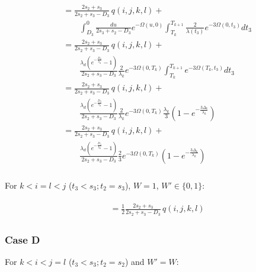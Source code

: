 \documentclass{article}
\begin{document}
\begin{align}
    \begin{split}
        &= \frac{2s_2+s_3}{2s_2+s_3-D_3}\,q(i,j,k,l) +\\
        &\qquad\int_{D_3}^{0}\frac{du}{2s_3+s_2-D_3}e^{-\Omega(u,0)}\int_{T_k}^{T_{k+1}}\frac{2}{\lambda(t_3)}e^{-3\Omega(0,t_3)}dt_3\\
        &= \frac{2s_2+s_3}{2s_2+s_3-D_3}\,q(i,j,k,l) +\\
        &\qquad\frac{\lambda_d\left(e^{-\frac{D_3}{\lambda_d}}-1\right)}{2s_2+s_3-D_3}
        \frac{2}{\lambda_k}e^{-3\Omega(0,T_k)}\int_{T_k}^{T_{k+1}}e^{-3\Omega(T_k,t_3)}dt_3\\
        &= \frac{2s_2+s_3}{2s_2+s_3-D_3}\,q(i,j,k,l) +\\
        &\qquad\frac{\lambda_d\left(e^{-\frac{D_3}{\lambda_d}}-1\right)}{2s_2+s_3-D_3}
        \frac{2}{\lambda_k}e^{-3\Omega(0,T_k)}\frac{\lambda_k}{3}\left(1-e^{-\frac{3\Delta_k}{\lambda_k}}\right)\\
        &= \frac{2s_2+s_3}{2s_2+s_3-D_3}\,q(i,j,k,l) +\\
        &\qquad\frac{\lambda_d\left(e^{-\frac{D_3}{\lambda_d}}-1\right)}{2s_2+s_3-D_3}
        \frac{2}{3}e^{-3\Omega(0,T_k)}\left(1-e^{-\frac{3\Delta_k}{\lambda_k}}\right)\\
    \end{split}
\end{align}

For $k<i=l<j$ ($t_3<s_3; t_2=s_3$), $W = 1$, $W' \in \{0,1\}$:

\begin{align}
    \begin{split}
        &= \frac{1}{2}\frac{2s_2+s_3}{2s_2+s_3-D_3}\,q(i,j,k,l)
    \end{split}
\end{align}

\subsubsection{Case D}
For $k<i< j=l$ ($t_3<s_3; t_2=s_2$) and $W' = W$:
\end{document}
